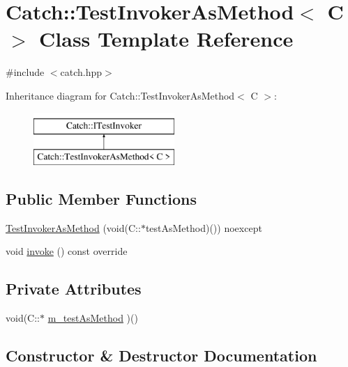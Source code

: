 \hypertarget{class_catch_1_1_test_invoker_as_method}{}\section{Catch\+::Test\+Invoker\+As\+Method$<$ C $>$ Class Template Reference}
\label{class_catch_1_1_test_invoker_as_method}


{\ttfamily \#include $<$catch.\+hpp$>$}

Inheritance diagram for Catch\+::Test\+Invoker\+As\+Method$<$ C $>$\+:\begin{figure}[H]
\begin{center}
\leavevmode
\includegraphics[height=2.000000cm]{class_catch_1_1_test_invoker_as_method}
\end{center}
\end{figure}
\subsection*{Public Member Functions}
\begin{DoxyCompactItemize}
\item 
\mbox{\hyperlink{class_catch_1_1_test_invoker_as_method_a119c4bdbbdd95c42859c18541987a1a4}{Test\+Invoker\+As\+Method}} (void(C\+::$\ast$test\+As\+Method)()) noexcept
\item 
void \mbox{\hyperlink{class_catch_1_1_test_invoker_as_method_a8115a06efe273f4112ec0b5452c1b5f2}{invoke}} () const override
\end{DoxyCompactItemize}
\subsection*{Private Attributes}
\begin{DoxyCompactItemize}
\item 
void(C\+::$\ast$ \mbox{\hyperlink{class_catch_1_1_test_invoker_as_method_a4851e50d6b43c022c41d5de776a27ed7}{m\+\_\+test\+As\+Method}} )()
\end{DoxyCompactItemize}


\subsection{Constructor \& Destructor Documentation}
\mbox{\label{class_catch_1_1_test_invoker_as_method_a119c4bdbbdd95c42859c18541987a1a4}} 
